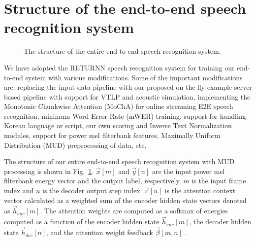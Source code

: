 \documentclass[a4paper]{article}
\begin{document}
\section{Structure of the end-to-end speech recognition system}
\label{sec:end_to_end_speech_recognition}


\begin{figure}[tbp]
  \begin{center}
    \resizebox{65mm}{!}{}
      \caption {  The structure of the entire end-to-end
      speech recognition system. 
     }
     \label{fig:entire_diagram}
  \end{center}
\vspace{-5mm}
\end{figure}


We have adopted the RETURNN speech recognition system \cite{p_doetsch_icassp_2017_00,
a_zeyer_interspeech_2018_00} for training our end-to-end system with various modifications.
Some of the important modifications are: replacing the input data pipeline with our 
proposed on-the-fly example server based pipeline with support for VTLP
and acoustic simulation,
implementing the Monotonic Chunkwise Attention (MoChA) \cite{c_chiu_iclr_2018_00}
for online streaming E2E speech recognition, minimum Word Error Rate (mWER) training,
support for handling Korean language or script, our own scoring and Inverse Text 
Normalization modules, support for power mel filterbank features, Maximally Uniform Distribution (MUD) preprocessing of data, etc.

The structure of our entire end-to-end speech recognition system
with MUD processing \cite{c_kim_interspeech_2019_01} is shown 
in Fig.~\ref{fig:entire_diagram}.
 $\vec{x}[m]$ and $\vec{y}[n]$ are the input power mel 
filterbank energy vector and the output label,
respectively. $m$ is the input frame index and $n$ is the decoder output
step index. $\vec{c}[n]$ is the attention context vector calculated 
as a weighted sum of the encoder hidden state vectors denoted as $\vec{h}_{enc}[m]$.
The attention weights are computed as a softmax of energies computed as 
a function of the encoder hidden state $\vec{h}_{enc}[m]$, the decoder hidden state
$\vec{h}_{dec}[n]$, and the attention weight
feedback $\vec{\beta}[m, n]$  \cite{a_zeyer_interspeech_2018_00}.
\end{document}
